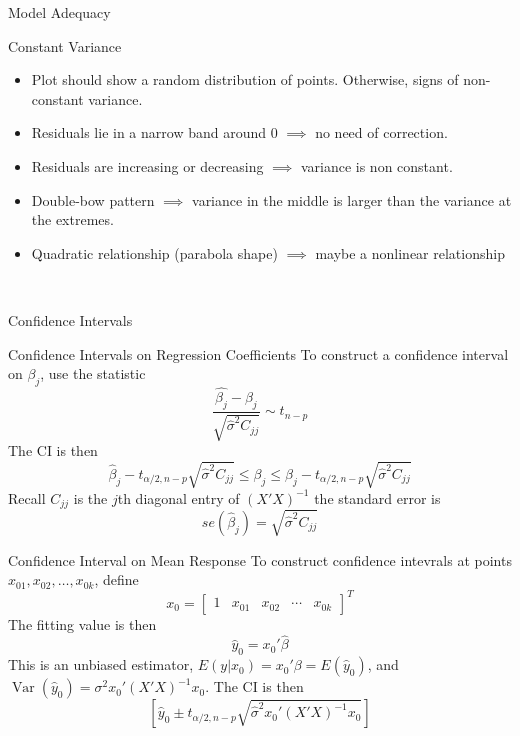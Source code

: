 \documentclass{article}
\DeclareMathOperator{\Var}{Var}
\begin{document}
\begin{multicols*}{3}
\begin{blackbox}{Model Adequacy}
\begin{redbox}{Constant Variance}
            \begin{itemize}[leftmargin=7pt]
                \item Plot should show a random distribution of points. Otherwise, signs of non-constant variance.
                \item Residuals lie in a narrow band around 0 $\implies$ no need of correction.
                \item Residuals are increasing or decreasing $\implies$ variance is non constant.
                \item Double-bow pattern $\implies$ variance in the middle is larger than the variance at the extremes.
                \item Quadratic relationship (parabola shape) $\implies$ maybe a nonlinear relationship
            \end{itemize}
        \end{redbox}\\[-2ex]
    \end{blackbox}
    \begin{blackbox}{Confidence Intervals}
        \begin{pinkbox}{Confidence Intervals on Regression Coefficients}
            To construct a confidence interval on $\beta_j$, use the statistic 
            \[\frac{\hat{\beta_j} - \beta_j}{\sqrt{\hat{\sigma}^2 C_{jj}}} \sim t_{n-p}\]
            The CI is then
            \[\hat{\beta}_j - t_{\alpha/2,n-p}\sqrt{\hat{\sigma}^2C_{jj}} \leq \beta_j \leq \hat{\beta}_j - t_{\alpha/2,n-p}\sqrt{\hat{\sigma}^2C_{jj}}\]
            Recall $C_{jj}$ is the $j$th diagonal entry of $(X'X)^{-1}$ the standard error is 
            \[se(\hat{\beta}_j) = \sqrt{\hat{\sigma}^2C_{jj}}\]
        \end{pinkbox}
        \begin{brownbox}{Confidence Interval on Mean Response}
            To construct confidence intevrals at points $x_{01}, x_{02}, \ldots, x_{0k}$, define 
            \renewcommand{\arraystretch}{1}
            \[x_0 = \begin{bmatrix}
                1 & x_{01} & x_{02} & \cdots & x_{0k}
            \end{bmatrix}^T\]
            The fitting value is then 
            \[\hat{y}_0 = x_0'\hat{\beta}\]
            This is an unbiased estimator, $E(y|x_0) = x_0'\beta=E(\hat{y}_0)$, and $\Var(\hat{y}_0) = \sigma^2x_0'(X'X)^{-1}x_0$. The CI is then 
            \[\left[\hat{y}_0 \pm t_{\alpha/2,n-p}\sqrt{\hat{\sigma}^2x_0'(X'X)^{-1}x_0}\right]\]
        \end{brownbox}

\end{blackbox}
\end{multicols*}
\end{document}
